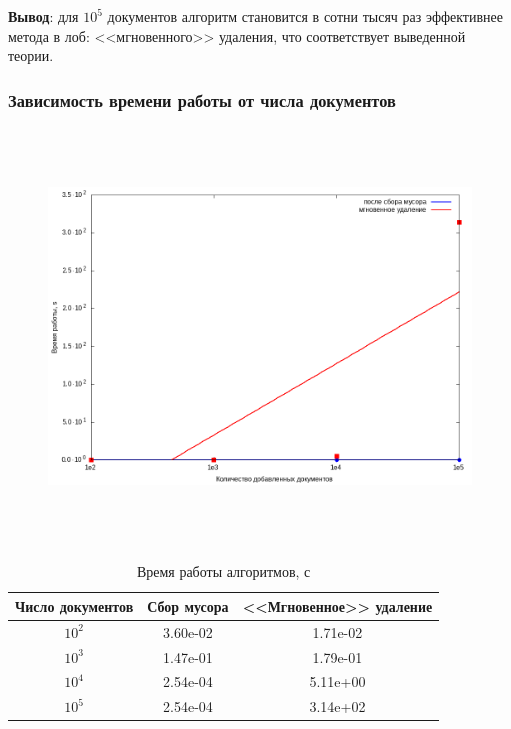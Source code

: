 \textbf{Вывод}: для $10^5$ документов алгоритм становится в сотни тысяч раз
эффективнее метода в лоб: <<мгновенного>> удаления, что соответствует выведенной теории.

\subsubsection{Зависимость времени работы от числа документов}

\begin{figure}[H]
\includegraphics[width=\linewidth, height=11cm]{fig/time.png}
\end{figure}

\begin{table}[H]
      \caption{Время работы алгоритмов, с}
      \centering
      \small
      \singlespacing
      \begin{tabular}{|c|c|c|}
            \hline
            Число документов & Сбор мусора                & <<Мгновенное>> удаление \\ \hline \hline
            $10^2$           & 3.60e-02                   & 1.71e-02              \\ \hline
            $10^3$           & 1.47e-01                   & 1.79e-01              \\ \hline
            $10^4$           & 2.54e-04                   & 5.11e+00              \\ \hline
            $10^5$           & 2.54e-04                   & 3.14e+02              \\ \hline
\end{tabular}
\end{table}

